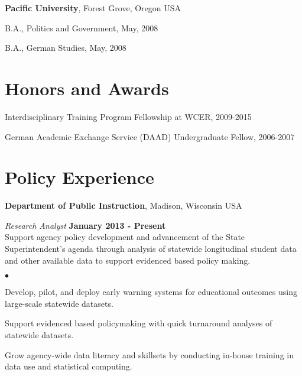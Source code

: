 \documentclass[margin,line]{res}
\newenvironment{list1}{
  \begin{list}{\ding{113}}{%
      \setlength{\itemsep}{0in}
      \setlength{\parsep}{0in} \setlength{\parskip}{0in}
      \setlength{\topsep}{0in} \setlength{\partopsep}{0in} 
      \setlength{\leftmargin}{0.17in}}}{\end{list}}
\newenvironment{list2}{
  \begin{list}{$\bullet$}{%
      \setlength{\itemsep}{0in}
      \setlength{\parsep}{0in} \setlength{\parskip}{0in}
      \setlength{\topsep}{0in} \setlength{\partopsep}{0in} 
      \setlength{\leftmargin}{0.2in}}}{\end{list}}
\begin{document}
\begin{resume}
{\bf Pacific University}, Forest Grove, Oregon USA\\
\vspace*{-.1in}
\begin{list1}
\item[] B.A., Politics and Government,  May, 2008
\item[] B.A., German Studies, May, 2008
\end{list1}


\section{\sc Honors and Awards} 

Interdisciplinary Training Program Fellowship at WCER, 2009-2015


\vspace*{-2.5mm}
German Academic Exchange Service (DAAD) Undergraduate Fellow, 2006-2007


\section{\sc Policy Experience}
{\bf Department of Public Instruction}, Madison, Wisconsin USA

\vspace{-.1cm}
{\em Research Analyst} \hfill {\bf January 2013 - Present}\\
Support agency policy development and advancement of the State Superintendent's agenda through analysis of statewide longitudinal student data and other available data to support evidenced based policy making. 
\begin{list2}
\item Develop, pilot, and deploy early warning systems for educational outcomes using large-scale statewide datasets. 
\item Support evidenced based policymaking with quick turnaround analyses of statewide datasets. 
\item Grow agency-wide data literacy and skillsets by conducting in-house training in data use and statistical computing.
\end{list2}


\end{resume}
\end{document}
